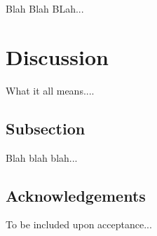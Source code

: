 \documentclass{article}
\begin{document}
\noindent Blah Blah BLah...


\section*{Discussion}

What it all means....

\subsection*{Subsection}

Blah blah blah...


\subsection*{Acknowledgements}
To be included upon acceptance...




\newpage


\end{document}
